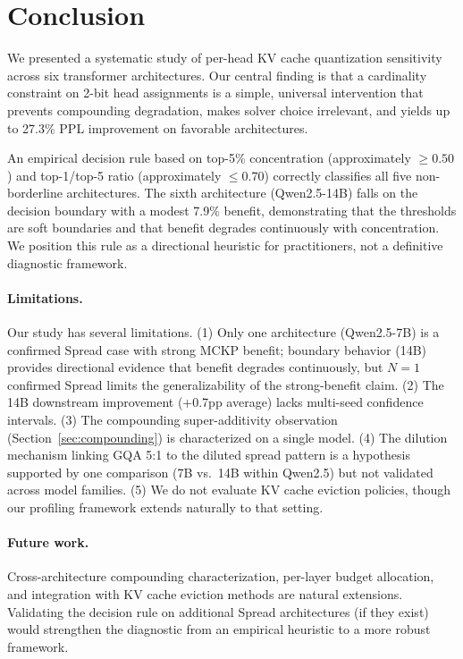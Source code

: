\documentclass[11pt,a4paper]{article}
\begin{document}
\section{Conclusion}

We presented a systematic study of per-head KV cache quantization sensitivity across six transformer architectures.
Our central finding is that a cardinality constraint on 2-bit head assignments is a simple, universal intervention that prevents compounding degradation, makes solver choice irrelevant, and yields up to 27.3\% PPL improvement on favorable architectures.

An empirical decision rule based on top-5\% concentration (approximately $\ge 0.50$) and top-1/top-5 ratio (approximately $\le 0.70$) correctly classifies all five non-borderline architectures.
The sixth architecture (Qwen2.5-14B) falls on the decision boundary with a modest 7.9\% benefit, demonstrating that the thresholds are soft boundaries and that benefit degrades continuously with concentration.
We position this rule as a directional heuristic for practitioners, not a definitive diagnostic framework.

\paragraph{Limitations.}
Our study has several limitations.
(1) Only one architecture (Qwen2.5-7B) is a confirmed Spread case with strong MCKP benefit; boundary behavior (14B) provides directional evidence that benefit degrades continuously, but $N = 1$ confirmed Spread limits the generalizability of the strong-benefit claim.
(2) The 14B downstream improvement (+0.7pp average) lacks multi-seed confidence intervals.
(3) The compounding super-additivity observation (Section~\ref{sec:compounding}) is characterized on a single model.
(4) The dilution mechanism linking GQA 5:1 to the diluted spread pattern is a hypothesis supported by one comparison (7B vs.\ 14B within Qwen2.5) but not validated across model families.
(5) We do not evaluate KV cache eviction policies, though our profiling framework extends naturally to that setting.

\paragraph{Future work.}
Cross-architecture compounding characterization, per-layer budget allocation, and integration with KV cache eviction methods are natural extensions.
Validating the decision rule on additional Spread architectures (if they exist) would strengthen the diagnostic from an empirical heuristic to a more robust framework.
\end{document}
